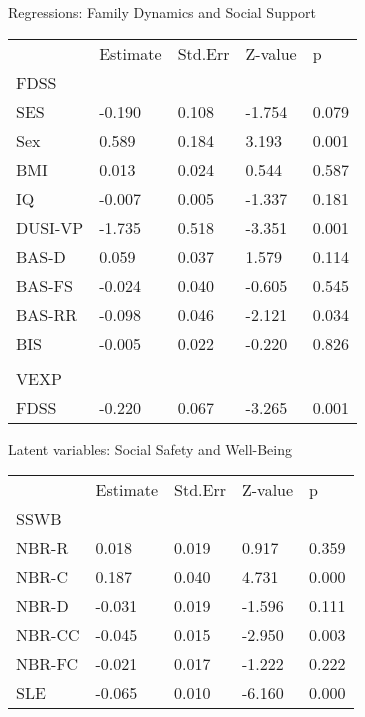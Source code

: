 \documentclass[utf8]{article}
\begin{document}
Regressions: Family Dynamics and Social Support
\begin{table}[]
\begin{tabular}{lllll}
        & Estimate & Std.Err & Z-value & p     \\
FDSS    &          &         &         &       \\
SES     & -0.190   & 0.108   & -1.754  & 0.079 \\
Sex     & 0.589    & 0.184   & 3.193   & 0.001 \\
BMI     & 0.013    & 0.024   & 0.544   & 0.587 \\
IQ      & -0.007   & 0.005   & -1.337  & 0.181 \\
DUSI-VP & -1.735   & 0.518   & -3.351  & 0.001 \\
BAS-D   & 0.059    & 0.037   & 1.579   & 0.114 \\
BAS-FS  & -0.024   & 0.040   & -0.605  & 0.545 \\
BAS-RR  & -0.098   & 0.046   & -2.121  & 0.034 \\
BIS     & -0.005   & 0.022   & -0.220  & 0.826 \\
        &          &         &         &       \\
VEXP    &          &         &         &       \\
FDSS    & -0.220   & 0.067   & -3.265  & 0.001
\end{tabular}
\end{table}


Latent variables: Social Safety and Well-Being
\begin{table}[]
\begin{tabular}{lllll}
       & Estimate & Std.Err & Z-value & p     \\
SSWB   &          &         &         &       \\
NBR-R  & 0.018    & 0.019   & 0.917   & 0.359 \\
NBR-C  & 0.187    & 0.040   & 4.731   & 0.000 \\
NBR-D  & -0.031   & 0.019   & -1.596  & 0.111 \\
NBR-CC & -0.045   & 0.015   & -2.950  & 0.003 \\
NBR-FC & -0.021   & 0.017   & -1.222  & 0.222 \\
SLE    & -0.065   & 0.010   & -6.160  & 0.000
\end{tabular}
\end{table}
\end{document}
